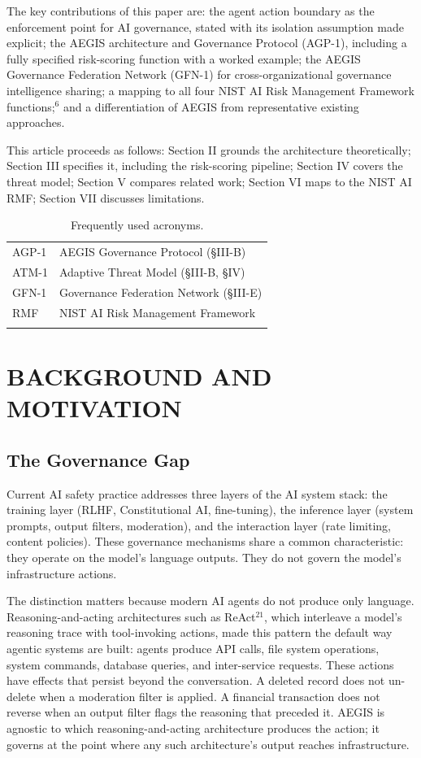 \documentclass{IEEEcsmag}
\begin{document}
The key contributions of this paper are: the agent action boundary as the enforcement point for AI governance, stated with its isolation assumption made explicit; the AEGIS architecture and Governance Protocol (AGP-1), including a fully specified risk-scoring function with a worked example; the AEGIS Governance Federation Network (GFN-1) for cross-organizational governance intelligence sharing; a mapping to all four NIST AI Risk Management Framework functions;$^{6}$ and a differentiation of AEGIS from representative existing approaches.

This article proceeds as follows: Section II grounds the architecture theoretically; Section III specifies it, including the risk-scoring pipeline; Section IV covers the threat model; Section V compares related work; Section VI maps to the NIST AI RMF; Section VII discusses limitations.

\begin{table}[htb]
\centering
\caption{Frequently used acronyms.}
\label{tab:glossary}
\tablefont
\begin{tabular}{ll}
\toprule
AGP-1 & AEGIS Governance Protocol (\S III-B)\\[1pt]
ATM-1 & Adaptive Threat Model (\S III-B, \S IV)\\[1pt]
GFN-1 & Governance Federation Network (\S III-E)\\[1pt]
RMF & NIST AI Risk Management Framework\\
\botrule
\end{tabular}
\end{table}

\section{BACKGROUND AND MOTIVATION}

\subsection{The Governance Gap}

Current AI safety practice addresses three layers of the AI system stack: the training layer (RLHF, Constitutional AI, fine-tuning), the inference layer (system prompts, output filters, moderation), and the interaction layer (rate limiting, content policies). These governance mechanisms share a common characteristic: they operate on the model's language outputs. They do not govern the model's infrastructure actions.

The distinction matters because modern AI agents do not produce only language. Reasoning-and-acting architectures such as ReAct$^{21}$, which interleave a model's reasoning trace with tool-invoking actions, made this pattern the default way agentic systems are built: agents produce API calls, file system operations, system commands, database queries, and inter-service requests. These actions have effects that persist beyond the conversation. A deleted record does not un-delete when a moderation filter is applied. A financial transaction does not reverse when an output filter flags the reasoning that preceded it. AEGIS is agnostic to which reasoning-and-acting architecture produces the action; it governs at the point where any such architecture's output reaches infrastructure.
\end{document}
